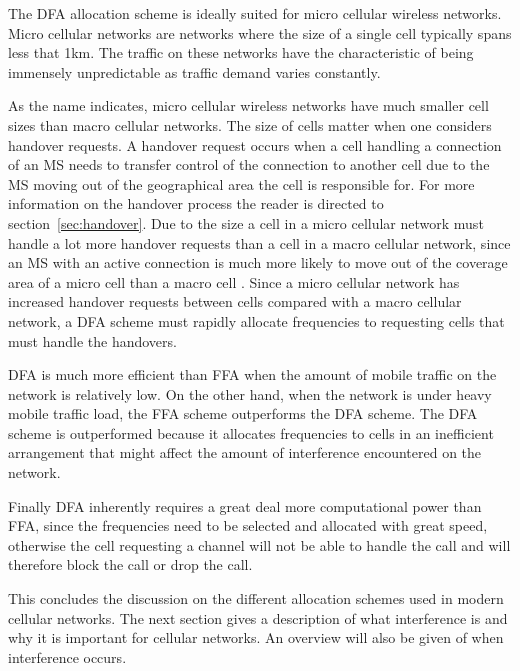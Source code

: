 The \gls{DFA} allocation scheme is ideally suited for micro cellular wireless networks. Micro cellular networks are networks where the size of a single cell typically spans less that 1km. The traffic on these networks have the characteristic of being immensely unpredictable as traffic demand varies constantly\cite{PrinciplesMobileCommunication,MobileWirelessCommunications}.

As the name indicates, micro cellular wireless networks have much smaller cell sizes than macro cellular networks. The size of cells matter when one considers handover requests. A handover request occurs when a cell handling a connection of an MS needs to transfer control of the connection to another cell due to the MS moving out of the geographical area the cell is responsible for. For more information on the handover process the reader is directed to section~\ref{sec:handover}. Due to the size a cell in a micro cellular network must handle a lot more handover requests than a cell in a macro cellular network, since an \gls{MS} with an active connection is much more likely to move out of the coverage area of a micro cell than a macro cell \cite{PrinciplesMobileCommunication,WirelessCommunications}.
Since a micro cellular network has increased handover requests between cells compared with a macro cellular network, a \gls{DFA} scheme must rapidly allocate frequencies to requesting cells that must handle the handovers\cite{PrinciplesMobileCommunication,WirelessCommunications}.

\gls{DFA} is much more efficient than \gls{FFA} when the amount of mobile traffic on the network is relatively low\cite{PrinciplesMobileCommunication,WirelessCommunications}. On the other hand, when the network is under heavy mobile traffic load, the \gls{FFA} scheme outperforms the \gls{DFA} scheme\cite{WirelessCommunications}. The \gls{DFA} scheme is outperformed because it allocates frequencies to cells in an inefficient arrangement that might affect the amount of interference encountered on the network\cite{MobileWirelessCommunications}.

Finally \gls{DFA} inherently requires a great deal more computational power than \gls{FFA}, since the frequencies need to be selected and allocated with great speed, otherwise the cell requesting a channel will not be able to handle the call and will therefore block the call or drop the call\cite{PrinciplesMobileCommunication,WirelessCommunications}.


This concludes the discussion on the different allocation schemes used in modern cellular networks. The next section gives a description of what interference is and why it is important for cellular networks. An overview will also be given of when interference occurs.

